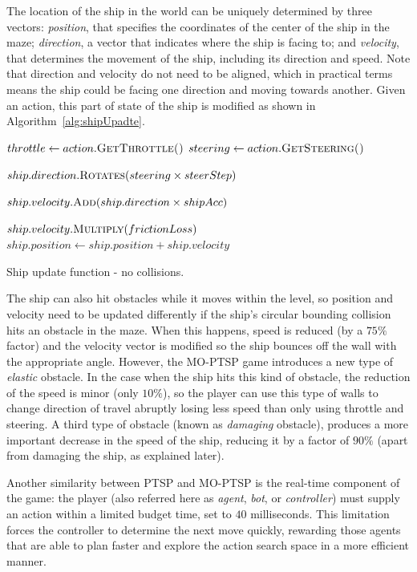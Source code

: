 \documentclass[conference]{IEEEtran}
\begin{document}
The location of the ship in the world can be uniquely determined by three vectors: \textit{position}, that specifies the coordinates of the center of the ship in the maze; \textit{direction}, a vector that indicates where the ship is facing to; and \textit{velocity}, that determines the movement of the ship, including its direction and speed. Note that direction and velocity do not need to be aligned, which in practical terms means the ship could be facing one direction and moving towards another. Given an action, this part of state of the ship is modified as shown in Algorithm~\ref{alg:shipUpadte}.

\begin{algorithm}[!h]
\begin{algorithmic}
	\State $throttle \gets action.\Call{GetThrottle()}{}$
	\State $steering \gets action.\Call{GetSteering()}{}$

	\State $ship.direction.\Call{Rotates}{steering \times steerStep}$

		\State $ship.velocity.\Call{Add}{ship.direction \times shipAcc}$
	\EndIf

	\State $ship.velocity.\Call{Multiply}{frictionLoss}$
	\State $ship.position \gets ship.position + ship.velocity$


\EndFunction
\end{algorithmic}
\caption{Ship update function - no collisions.}
\label{alg:shipUpadte}
\end{algorithm}

The ship can also hit obstacles while it moves within the level, so position and velocity need to be updated differently if the ship's circular bounding collision hits an obstacle in the maze. When this happens, speed is reduced (by a $75\%$ factor) and the velocity vector is modified so the ship bounces off the wall with the appropriate angle. However, the MO-PTSP game introduces a new type of \textit{elastic} obstacle. In the case when the ship hits this kind of obstacle, the reduction of the speed is minor (only $10\%$), so the player can use this type of walls to change direction of travel abruptly losing less speed than only using throttle and steering. A third type of obstacle (known as \textit{damaging} obstacle), produces a more important decrease in the speed of the ship, reducing it by a factor of $90\%$ (apart from damaging the ship, as explained later).

Another similarity between PTSP and MO-PTSP is the real-time component of the game: the player (also referred here as \textit{agent}, \textit{bot}, or \textit{controller}) must supply an action within a limited budget time, set to $40$ milliseconds. This limitation forces the controller to determine the next move quickly, rewarding those agents that are able to plan faster and explore the action search space in a more efficient manner.
\end{document}
